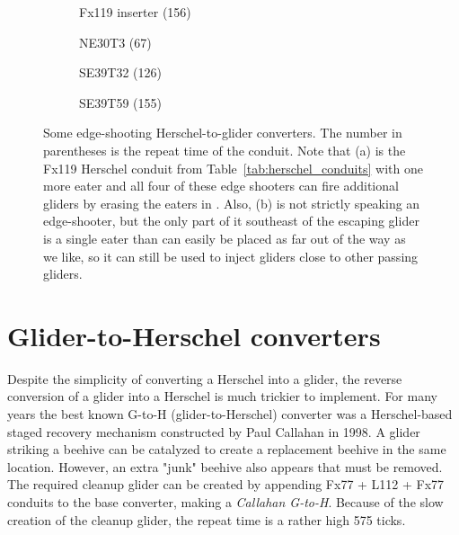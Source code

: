 \begin{figure}[!htb]
	\centering
	\begin{subfigure}{.22\textwidth}
		\centering
		\caption{Fx119 inserter (156)}
		\label{fig:herschel_to_glider_edge_3}
	\end{subfigure}\quad%
	\begin{subfigure}{.22\textwidth}
		\centering\vspace*{0.35cm}
		\caption{NE30T3 (67)}
		\label{fig:herschel_to_glider_edge_4}
	\end{subfigure}\quad%
	\begin{subfigure}{.22\textwidth}
		\centering\vspace*{0.66cm}
		\caption{SE39T32 (126)}
		\label{fig:herschel_to_glider_edge_1}
	\end{subfigure}\quad%
	\begin{subfigure}{.22\textwidth}
		\centering
		\caption{SE39T59 (155)}
		\label{fig:herschel_to_glider_edge_2}
	\end{subfigure}
	\caption{Some edge-shooting Herschel-to-glider converters. The number in parentheses is the repeat time of the conduit. Note that (a) is the Fx119 Herschel conduit from Table~\ref{tab:herschel_conduits} with one more eater and all four of these edge shooters can fire additional gliders by erasing the eaters in . Also, (b) is not strictly speaking an edge-shooter, but the only part of it southeast of the escaping glider is a single eater than can easily be placed as far out of the way as we like, so it can still be used to inject gliders close to other passing gliders.}\label{fig:herschel_to_glider_edge}
\end{figure}

\section{Glider-to-Herschel converters}\label{sec:g_to_h}
Despite the simplicity of converting a Herschel into a glider, the reverse conversion of a glider into a Herschel is much trickier to implement. For many years the best known G-to-H (glider-to-Herschel) converter was a Herschel-based staged recovery mechanism constructed by Paul Callahan in 1998. A glider striking a beehive can be catalyzed to create a replacement beehive in the same location.  However, an extra "junk" beehive also appears that must be removed.  The required cleanup glider can be created by appending Fx77 + L112 + Fx77 conduits to the base converter, making a \emph{Callahan G-to-H}.  Because of the slow creation of the cleanup glider, the repeat time is a rather high 575 ticks.

